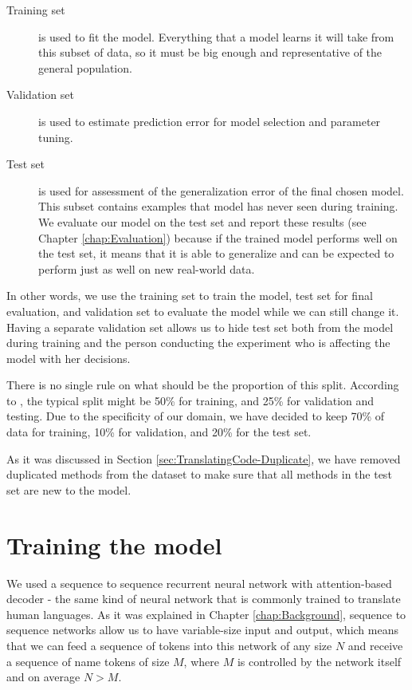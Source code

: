 \begin{description}
  \item [Training set] is used to fit the model. Everything that a model learns it will take from this subset of data, so it must be big enough and representative of the general population.
  \item [Validation set] is used to estimate prediction error for model selection and parameter tuning.
  \item [Test set] is used for assessment of the generalization error of the final chosen model. This subset contains examples that model has never seen during training. We evaluate our model on the test set and report these results (see Chapter \ref{chap:Evaluation}) because if the trained model performs well on the test set, it means that it is able to generalize and can be expected to perform just as well on new real-world data.
\end{description}

In other words, we use the training set to train the model, test set for final evaluation, and validation set to evaluate the model while we can still change it. Having a separate validation set allows us to hide test set both from the model during training and the person conducting the experiment who is affecting the model with her decisions.

There is no single rule on what should be the proportion of this split. According to \cite{Frie01}, the typical split might be 50\% for training, and 25\% for validation and testing. Due to the specificity of our domain, we have decided to keep 70\% of data for training, 10\% for validation, and 20\% for the test set.

As it was discussed in Section \ref{sec:TranslatingCode-Duplicate}, we have removed duplicated methods from the dataset to make sure that all methods in the test set are new to the model.

\section{Training the model}
\label{sec:TranslatingCode-Model}

We used a sequence to sequence recurrent neural network with attention-based decoder - the same kind of neural network that is commonly trained to translate human languages. As it was explained in Chapter \ref{chap:Background}, sequence to sequence networks allow us to have variable-size input and output, which means that we can feed a sequence of tokens into this network of any size $N$ and receive a sequence of name tokens of size $M$, where $M$ is controlled by the network itself and on average $N > M$.

